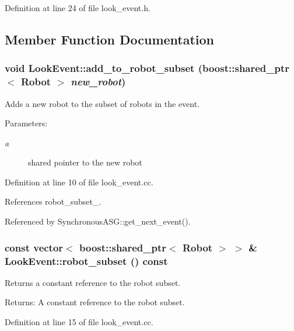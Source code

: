 Definition at line 24 of file look\_\-event.h.

\subsection{Member Function Documentation}
\hypertarget{class_look_event_69ea06b306f36339e6e5fbe3ffa7b1b8}{
\subsubsection[add\_\-to\_\-robot\_\-subset]{\setlength{\rightskip}{0pt plus 5cm}void LookEvent::add\_\-to\_\-robot\_\-subset (boost::shared\_\-ptr$<$ Robot $>$ {\em new\_\-robot})}}
\label{class_look_event_69ea06b306f36339e6e5fbe3ffa7b1b8}


Adds a new robot to the subset of robots in the event. \begin{Desc}
\item[Parameters:]
\begin{description}
\item[{\em a}]shared pointer to the new robot \end{description}
\end{Desc}


Definition at line 10 of file look\_\-event.cc.

References robot\_\-subset\_\-.

Referenced by SynchronousASG::get\_\-next\_\-event().\hypertarget{class_look_event_3c33e32768298a315a0a242c823ea957}{
\subsubsection[robot\_\-subset]{\setlength{\rightskip}{0pt plus 5cm}const vector$<$ boost::shared\_\-ptr$<$ Robot $>$ $>$ \& LookEvent::robot\_\-subset () const}}
\label{class_look_event_3c33e32768298a315a0a242c823ea957}


Returns a constant reference to the robot subset. \begin{Desc}
\item[Returns:]A constant reference to the robot subset. \end{Desc}


Definition at line 15 of file look\_\-event.cc.

